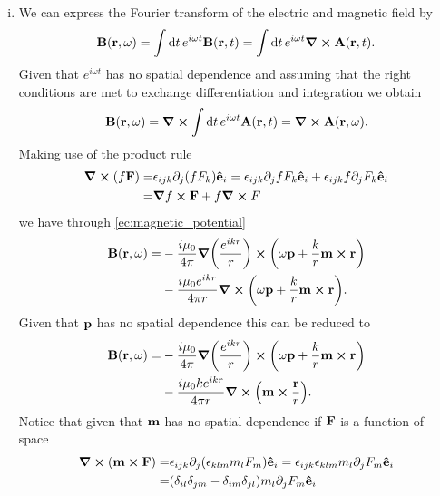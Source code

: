 \documentclass{article}
\begin{document}
\begin{enumerate}[(i)]
\item We can express the Fourier transform of the electric and magnetic field by
\begin{equation}
\vb{B}(\vb{r},\omega)=\int\dd{t}e^{i\omega t}\vb{B}(\vb{r},t)=\int\dd{t}e^{i\omega t}\curl{\vb{A}}(\vb{r},t).
\end{equation}
Given that $e^{i\omega t}$ has no spatial dependence and assuming that the right conditions are met to exchange differentiation and integration we obtain
\begin{equation}
\vb{B}(\vb{r},\omega)=\curl{\int\dd{t}e^{i\omega t}\vb{A}(\vb{r},t)}=\curl{\vb{A}}(\vb{r},\omega).
\end{equation}
Making use of the product rule 
\begin{align}
\begin{split}
\curl(f\vb{F})=&\epsilon_{ijk}\partial_j(fF_k)\vu{e}_i=\epsilon_{ijk}\partial_jfF_k\vu{e}_i+\epsilon_{ijk}f\partial_jF_k\vu{e}_i\\
=&\grad{f}\cross\vb{F}+f\curl{F}
\end{split}
\end{align}
we have through \eqref{ec:magnetic_potential}
\begin{align}
\begin{split}
\vb{B}(\vb{r},\omega)=&-\frac{i\mu_0}{4\pi}\grad(\frac{e^{ikr}}{r})\cross\qty(\omega\vb{p}+\frac{k}{r}\vb{m}\cross\vb{r})\\
&-\frac{i\mu_0e^{ikr}}{4\pi r}\curl(\omega\vb{p}+\frac{k}{r}\vb{m}\cross\vb{r}).
\end{split}
\end{align}
Given that $\vb{p}$ has no spatial dependence this can be reduced to
\begin{align}
\begin{split}
\vb{B}(\vb{r},\omega)=&-\frac{i\mu_0}{4\pi}\grad(\frac{e^{ikr}}{r})\cross\qty(\omega\vb{p}+\frac{k}{r}\vb{m}\cross\vb{r})\\
&-\frac{i\mu_0ke^{ikr}}{4\pi r}\curl(\vb{m}\cross\frac{\vb{r}}{r}).
\end{split}
\end{align}
Notice that given that $\vb{m}$ has no spatial dependence if $\vb{F}$ is a function of space
\begin{align}
\begin{split}
\curl(\vb{m}\cross\vb{F})=&\epsilon_{ijk}\partial_j(\epsilon_{klm}m_lF_m)\vu{e}_i=\epsilon_{ijk}\epsilon_{klm}m_l\partial_jF_m\vu{e}_i\\
=&(\delta_{il}\delta_{jm}-\delta_{im}\delta_{jl})m_l\partial_jF_m\vu{e}_i\\

\end{split}
\end{align}
\end{enumerate}
\end{document}
